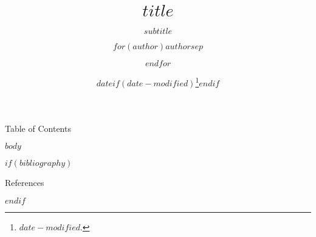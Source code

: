 \documentclass[fontset=fandol,envcountsect]{ctexbeamer}
\title{$title$}
\subtitle{$subtitle$}
\author{$for(author)$$author$$sep$ \and $endfor$}
\institute{$for(institute)$$institute$$sep$ \and $endfor$}
\date{$date$$if(date-modified)$\thanks{\transmodified \space $date-modified$.}$endif$}
\def\transtoc{目录}
\def\transreferences{参考文献}
\def\transtoc{Table of Contents}
\def\transreferences{References}
\theoremstyle{theorem}
\theoremstyle{example}
\theoremstyle{remark}
\theoremstyle{theorem}
\theoremstyle{example}
\theoremstyle{remark}
\begin{document}
\frame{\titlepage}

\begin{frame}{\transtoc}
  \tableofcontents
\end{frame}

$body$

$if(bibliography)$
\begin{frame}[allowframebreaks]{\transreferences}
    \printbibliography[heading=none]
\end{frame}
$endif$
\end{document}
